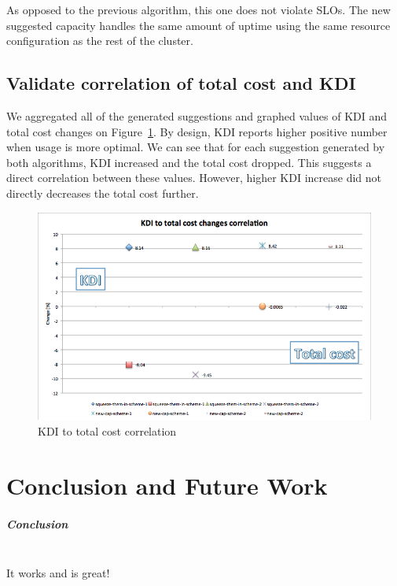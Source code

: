 \documentclass[]{final_report}
\newcommand{\myparagraph}[1]{\paragraph{#1}\mbox{}\\}
\begin{document}
As opposed to the previous algorithm, this one does not violate SLOs. The new suggested capacity handles the same amount of uptime using the same resource configuration as the rest of the cluster. 


\section{Validate correlation of total cost and KDI}

We aggregated all of the generated suggestions and graphed values of KDI and total cost changes on Figure~\ref{fig:kdi_to_cost}. 
By design, KDI reports higher positive number when usage is more optimal. We can see that for each suggestion generated by both algorithms, KDI increased and the total cost dropped. This suggests a direct correlation between these values. However, higher KDI increase did not directly decreases the total cost further.  

\begin{figure}[H]
	\includegraphics[width=\linewidth]{figures/kdi_to_cost}
	\caption{KDI to total cost correlation}
	\label{fig:kdi_to_cost}
\end{figure}


\chapter{Conclusion and Future Work}

\myparagraph{Conclusion}
It works and is great!
\end{document}
